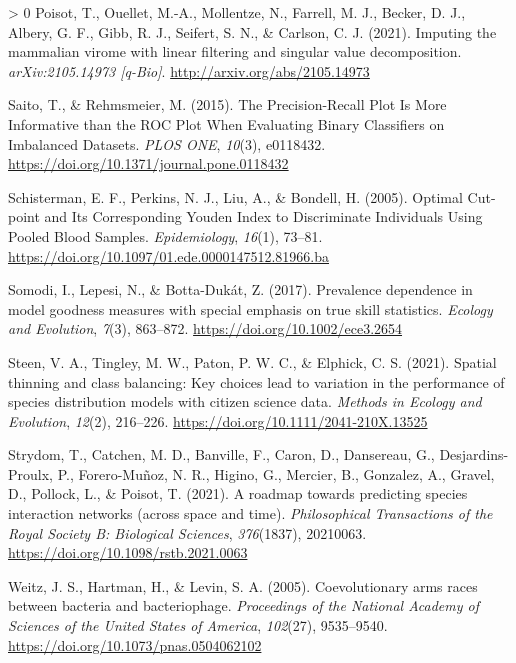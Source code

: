 \documentclass[11pt]{article}
\newlength{\cslhangindent}
\newenvironment{CSLReferences}[3] %
 {%
  \setlength{\parindent}{0pt}
  \ifodd #1 \everypar{\setlength{\hangindent}{\cslhangindent}}\ignorespaces\fi
  \ifnum #2 > 0
  \setlength{\parskip}{#2\baselineskip}
  \fi
 }%
 {}
\begin{document}
\begin{CSLReferences}{1}{0}
\leavevmode\hypertarget{ref-Poisot2021ImpMam}{}%
Poisot, T., Ouellet, M.-A., Mollentze, N., Farrell, M. J., Becker, D.
J., Albery, G. F., Gibb, R. J., Seifert, S. N., \& Carlson, C. J.
(2021). Imputing the mammalian virome with linear filtering and singular
value decomposition. \emph{arXiv:2105.14973 {[}q-Bio{]}}.
\url{http://arxiv.org/abs/2105.14973}

\leavevmode\hypertarget{ref-Saito2015PrePlo}{}%
Saito, T., \& Rehmsmeier, M. (2015). The Precision-Recall Plot Is More
Informative than the ROC Plot When Evaluating Binary Classifiers on
Imbalanced Datasets. \emph{PLOS ONE}, \emph{10}(3), e0118432.
\url{https://doi.org/10.1371/journal.pone.0118432}

\leavevmode\hypertarget{ref-Schisterman2005OptCut}{}%
Schisterman, E. F., Perkins, N. J., Liu, A., \& Bondell, H. (2005).
Optimal Cut-point and Its Corresponding Youden Index to Discriminate
Individuals Using Pooled Blood Samples. \emph{Epidemiology},
\emph{16}(1), 73--81.
\url{https://doi.org/10.1097/01.ede.0000147512.81966.ba}

\leavevmode\hypertarget{ref-Somodi2017PreDep}{}%
Somodi, I., Lepesi, N., \& Botta-Dukát, Z. (2017). Prevalence dependence
in model goodness measures with special emphasis on true skill
statistics. \emph{Ecology and Evolution}, \emph{7}(3), 863--872.
\url{https://doi.org/10.1002/ece3.2654}

\leavevmode\hypertarget{ref-Steen2021SpaThi}{}%
Steen, V. A., Tingley, M. W., Paton, P. W. C., \& Elphick, C. S. (2021).
Spatial thinning and class balancing: Key choices lead to variation in
the performance of species distribution models with citizen science
data. \emph{Methods in Ecology and Evolution}, \emph{12}(2), 216--226.
\url{https://doi.org/10.1111/2041-210X.13525}

\leavevmode\hypertarget{ref-Strydom2021RoaPre}{}%
Strydom, T., Catchen, M. D., Banville, F., Caron, D., Dansereau, G.,
Desjardins-Proulx, P., Forero-Muñoz, N. R., Higino, G., Mercier, B.,
Gonzalez, A., Gravel, D., Pollock, L., \& Poisot, T. (2021). A roadmap
towards predicting species interaction networks (across space and time).
\emph{Philosophical Transactions of the Royal Society B: Biological
Sciences}, \emph{376}(1837), 20210063.
\url{https://doi.org/10.1098/rstb.2021.0063}

\leavevmode\hypertarget{ref-Weitz2005CoeArm}{}%
Weitz, J. S., Hartman, H., \& Levin, S. A. (2005). Coevolutionary arms
races between bacteria and bacteriophage. \emph{Proceedings of the
National Academy of Sciences of the United States of America},
\emph{102}(27), 9535--9540.
\url{https://doi.org/10.1073/pnas.0504062102}


\end{CSLReferences}
\end{document}
